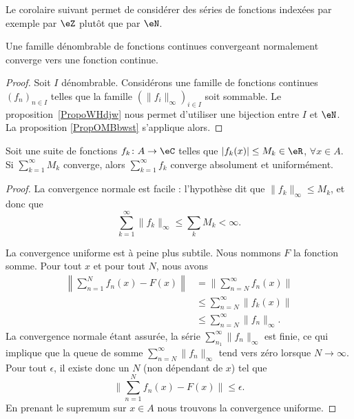 Le corolaire suivant permet de considérer des séries de fonctions indexées par exemple par \( \eZ\) plutôt que par \( \eN\).
\begin{corollary}		\label{CORooEWOBooShCysg}
	Une famille dénombrable de fonctions continues convergeant normalement converge vers une fonction continue.
\end{corollary}

\begin{proof}
	Soit \( I\) dénombrable. Considérons une famille de fonctions continues \( (f_n)_{n\in I}\) telles que la famille \( (\| f_i \|_{\infty})_{i\in I}\) soit sommable. Le proposition~\ref{PropoWHdjw} nous permet d'utiliser une bijection entre \( I\) et \( \eN\). La proposition \ref{PropOMBbwst} s'applique alors.
\end{proof}

\begin{theorem}		\label{ThoCritWeierstrass}
	Soit une suite de fonctions \( f_k\colon A\to \eC\) telles que \( | f_k(x) |\leq M_k\in\eR\), \( \forall x\in A\). Si \( \sum_{k=1}^{\infty}M_k\) converge, alors \( \sum_{k=1}^{\infty}f_k\) converge absolument et uniformément.
\end{theorem}

\begin{proof}
	La convergence normale est facile : l'hypothèse dit que \( \| f_k \|_{\infty}\leq M_k\), et donc que
	\begin{equation}
		\sum_{k=1}^{\infty}\| f_k \|_{\infty}\leq \sum_kM_k<\infty.
	\end{equation}

	La convergence uniforme est à peine plus subtile. Nous nommons \( F\) la fonction somme. Pour tout \( x\) et pour tout \( N\), nous avons
	\begin{subequations}
		\begin{align}
			\left\| \sum_{n=1}^Nf_n(x)-F(x) \right\| & =\| \sum_{n=N}^{\infty}f_n(x) \|            \\
			                                         & \leq\sum_{n=N}^{\infty}\| f_k(x) \|         \\
			                                         & \leq \sum_{n=N}^{\infty}\| f_n \|_{\infty}.
		\end{align}
	\end{subequations}
	La convergence normale étant assurée, la série \( \sum_{n_1}^{\infty}\| f_n \|_{\infty}\) est finie, ce qui implique que la queue de somme \( \sum_{n=N}^{\infty}\| f_n \|_{\infty}\) tend vers zéro lorsque \( N\to \infty\). Pour tout \( \epsilon\), il existe donc un \( N\) (non dépendant de \( x\)) tel que
	\begin{equation}
		\| \sum_{n=1}^Nf_n(x)-F(x) \|\leq \epsilon.
	\end{equation}
	En prenant le supremum sur \( x\in A\) nous trouvons la convergence uniforme.
\end{proof}

